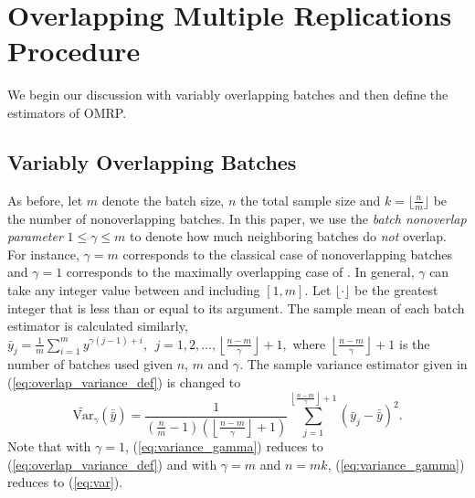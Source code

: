 \documentclass[12pt]{article}
\newcommand{\vartg}[1]{\widetilde{\mathrm{Var}}_\gamma \left( #1 \right)}
\newcommand{\nb}{\left\lfloor\tfrac{n-m}{\gamma}\right\rfloor+1}
\newcommand{\yb}{\bar{y}}
\newcommand{\ybb}{\bar{\yb}}
\begin{document}
\section{Overlapping Multiple Replications Procedure} 
\label{sec:omrp}

We begin our discussion with variably overlapping batches and then define the estimators of OMRP.

\subsection{Variably Overlapping Batches} 
\label{ssec:overlap}

As before, let $m$ denote the batch size, $n$ the total sample size and $k = \lfloor \tfrac{n}{m} \rfloor$ be the number of nonoverlapping batches.  
In this paper, we use the {\it batch nonoverlap parameter} $1 \leq \gamma \leq m$ to denote how much neighboring batches do {\it not} overlap.  
For instance, $\gamma = m$ corresponds to the classical case of nonoverlapping batches and $\gamma = 1$ corresponds to the maximally overlapping case of \citet{Meketon1984}.  
In general, $\gamma$ can take any integer value between and including $[1,m]$. 
Let $\lfloor \cdot \rfloor$ be the greatest integer that is less than or equal to its argument. 
The sample mean of each batch estimator is calculated similarly, 
$
\yb_j = \frac{1}{m} \sum_{i=1}^m y^{\gamma(j-1) + i},\ \  j = 1, 2, \dots, \nb, 
$
where $\nb$ is the number of batches used given $n$, $m$ and $\gamma$.  
The sample variance estimator given in (\ref{eq:overlap_variance_def}) is changed to
\begin{equation} \label{eq:variance_gamma}
	\vartg{\ybb} = \frac{1}{\left( \tfrac{n}{m} - 1 \right) \left( \nb \right)}  \sum_{j=1}^{\nb} (\yb_j - \ybb)^2.
\end{equation}
Note that with $\gamma=1$, (\ref{eq:variance_gamma}) reduces to (\ref{eq:overlap_variance_def}) and with $\gamma=m$ and $n=mk$, (\ref{eq:variance_gamma}) reduces to (\ref{eq:var}).
\end{document}
